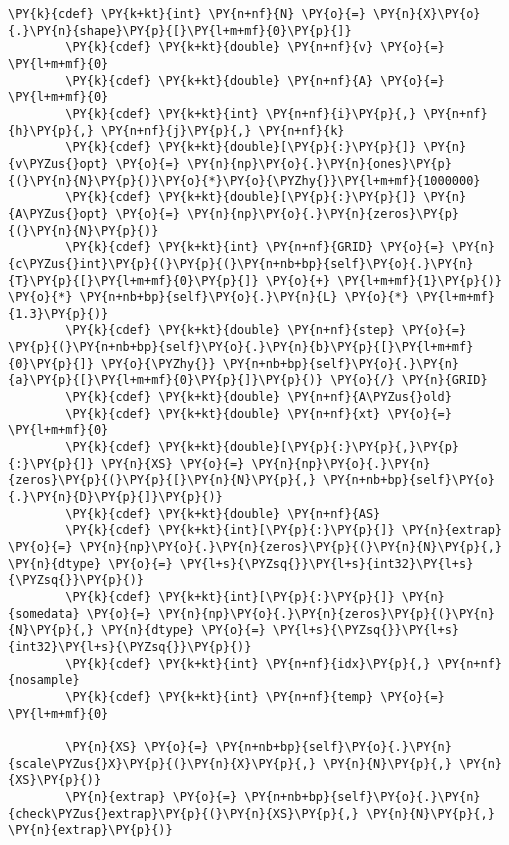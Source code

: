 \begin{Verbatim}[commandchars=\\\{\}]
        \PY{k}{cdef} \PY{k+kt}{int} \PY{n+nf}{N} \PY{o}{=} \PY{n}{X}\PY{o}{.}\PY{n}{shape}\PY{p}{[}\PY{l+m+mf}{0}\PY{p}{]}
        \PY{k}{cdef} \PY{k+kt}{double} \PY{n+nf}{v} \PY{o}{=} \PY{l+m+mf}{0}
        \PY{k}{cdef} \PY{k+kt}{double} \PY{n+nf}{A} \PY{o}{=} \PY{l+m+mf}{0}
        \PY{k}{cdef} \PY{k+kt}{int} \PY{n+nf}{i}\PY{p}{,} \PY{n+nf}{h}\PY{p}{,} \PY{n+nf}{j}\PY{p}{,} \PY{n+nf}{k}
        \PY{k}{cdef} \PY{k+kt}{double}[\PY{p}{:}\PY{p}{]} \PY{n}{v\PYZus{}opt} \PY{o}{=} \PY{n}{np}\PY{o}{.}\PY{n}{ones}\PY{p}{(}\PY{n}{N}\PY{p}{)}\PY{o}{*}\PY{o}{\PYZhy{}}\PY{l+m+mf}{1000000}
        \PY{k}{cdef} \PY{k+kt}{double}[\PY{p}{:}\PY{p}{]} \PY{n}{A\PYZus{}opt} \PY{o}{=} \PY{n}{np}\PY{o}{.}\PY{n}{zeros}\PY{p}{(}\PY{n}{N}\PY{p}{)}
        \PY{k}{cdef} \PY{k+kt}{int} \PY{n+nf}{GRID} \PY{o}{=} \PY{n}{c\PYZus{}int}\PY{p}{(}\PY{p}{(}\PY{n+nb+bp}{self}\PY{o}{.}\PY{n}{T}\PY{p}{[}\PY{l+m+mf}{0}\PY{p}{]} \PY{o}{+} \PY{l+m+mf}{1}\PY{p}{)} \PY{o}{*} \PY{n+nb+bp}{self}\PY{o}{.}\PY{n}{L} \PY{o}{*} \PY{l+m+mf}{1.3}\PY{p}{)}
        \PY{k}{cdef} \PY{k+kt}{double} \PY{n+nf}{step} \PY{o}{=}  \PY{p}{(}\PY{n+nb+bp}{self}\PY{o}{.}\PY{n}{b}\PY{p}{[}\PY{l+m+mf}{0}\PY{p}{]} \PY{o}{\PYZhy{}} \PY{n+nb+bp}{self}\PY{o}{.}\PY{n}{a}\PY{p}{[}\PY{l+m+mf}{0}\PY{p}{]}\PY{p}{)} \PY{o}{/} \PY{n}{GRID}
        \PY{k}{cdef} \PY{k+kt}{double} \PY{n+nf}{A\PYZus{}old}
        \PY{k}{cdef} \PY{k+kt}{double} \PY{n+nf}{xt} \PY{o}{=} \PY{l+m+mf}{0}
        \PY{k}{cdef} \PY{k+kt}{double}[\PY{p}{:}\PY{p}{,}\PY{p}{:}\PY{p}{]} \PY{n}{XS} \PY{o}{=} \PY{n}{np}\PY{o}{.}\PY{n}{zeros}\PY{p}{(}\PY{p}{[}\PY{n}{N}\PY{p}{,} \PY{n+nb+bp}{self}\PY{o}{.}\PY{n}{D}\PY{p}{]}\PY{p}{)}
        \PY{k}{cdef} \PY{k+kt}{double} \PY{n+nf}{AS}
        \PY{k}{cdef} \PY{k+kt}{int}[\PY{p}{:}\PY{p}{]} \PY{n}{extrap} \PY{o}{=} \PY{n}{np}\PY{o}{.}\PY{n}{zeros}\PY{p}{(}\PY{n}{N}\PY{p}{,} \PY{n}{dtype} \PY{o}{=} \PY{l+s}{\PYZsq{}}\PY{l+s}{int32}\PY{l+s}{\PYZsq{}}\PY{p}{)}
        \PY{k}{cdef} \PY{k+kt}{int}[\PY{p}{:}\PY{p}{]} \PY{n}{somedata} \PY{o}{=} \PY{n}{np}\PY{o}{.}\PY{n}{zeros}\PY{p}{(}\PY{n}{N}\PY{p}{,} \PY{n}{dtype} \PY{o}{=} \PY{l+s}{\PYZsq{}}\PY{l+s}{int32}\PY{l+s}{\PYZsq{}}\PY{p}{)}
        \PY{k}{cdef} \PY{k+kt}{int} \PY{n+nf}{idx}\PY{p}{,} \PY{n+nf}{nosample}
        \PY{k}{cdef} \PY{k+kt}{int} \PY{n+nf}{temp} \PY{o}{=} \PY{l+m+mf}{0}

        \PY{n}{XS} \PY{o}{=} \PY{n+nb+bp}{self}\PY{o}{.}\PY{n}{scale\PYZus{}X}\PY{p}{(}\PY{n}{X}\PY{p}{,} \PY{n}{N}\PY{p}{,} \PY{n}{XS}\PY{p}{)}
        \PY{n}{extrap} \PY{o}{=} \PY{n+nb+bp}{self}\PY{o}{.}\PY{n}{check\PYZus{}extrap}\PY{p}{(}\PY{n}{XS}\PY{p}{,} \PY{n}{N}\PY{p}{,} \PY{n}{extrap}\PY{p}{)}


\end{Verbatim}
